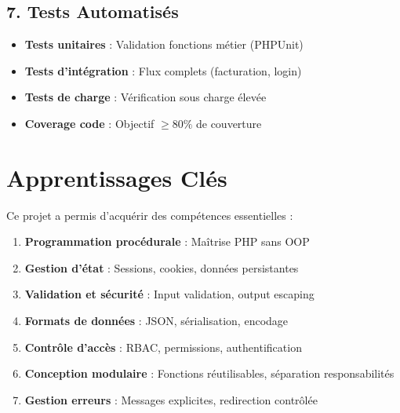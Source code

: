 \documentclass[12pt,a4paper]{report}
\begin{document}
\subsection{7. Tests Automatisés}

\begin{itemize}
    \item \textbf{Tests unitaires} : Validation fonctions métier (PHPUnit)
    \item \textbf{Tests d'intégration} : Flux complets (facturation, login)
    \item \textbf{Tests de charge} : Vérification sous charge élevée
    \item \textbf{Coverage code} : Objectif $\geq 80\%$ de couverture
\end{itemize}

\section{Apprentissages Clés}

Ce projet a permis d'acquérir des compétences essentielles :

\begin{enumerate}
    \item \textbf{Programmation procédurale} : Maîtrise PHP sans OOP
    \item \textbf{Gestion d'état} : Sessions, cookies, données persistantes
    \item \textbf{Validation et sécurité} : Input validation, output escaping
    \item \textbf{Formats de données} : JSON, sérialisation, encodage
    \item \textbf{Contrôle d'accès} : RBAC, permissions, authentification
    \item \textbf{Conception modulaire} : Fonctions réutilisables, séparation responsabilités
    \item \textbf{Gestion erreurs} : Messages explicites, redirection contrôlée
\end{enumerate}
\end{document}
